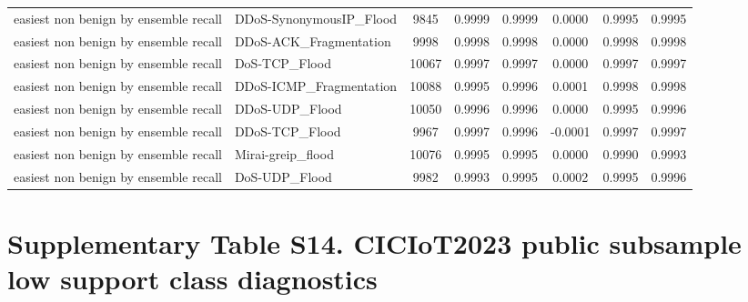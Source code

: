 \documentclass[10pt]{article}
\begin{document}
\begin{center}
\begin{longtable}{p{2.7cm}p{2.5cm}cccccc}
easiest non benign by ensemble recall & DDoS-SynonymousIP\_Flood & 9845 & 0.9999 & 0.9999 & 0.0000 & 0.9995 & 0.9995 \\
easiest non benign by ensemble recall & DDoS-ACK\_Fragmentation & 9998 & 0.9998 & 0.9998 & 0.0000 & 0.9998 & 0.9998 \\
easiest non benign by ensemble recall & DoS-TCP\_Flood & 10067 & 0.9997 & 0.9997 & 0.0000 & 0.9997 & 0.9997 \\
easiest non benign by ensemble recall & DDoS-ICMP\_Fragmentation & 10088 & 0.9995 & 0.9996 & 0.0001 & 0.9998 & 0.9998 \\
easiest non benign by ensemble recall & DDoS-UDP\_Flood & 10050 & 0.9996 & 0.9996 & 0.0000 & 0.9995 & 0.9996 \\
easiest non benign by ensemble recall & DDoS-TCP\_Flood & 9967 & 0.9997 & 0.9996 & -0.0001 & 0.9997 & 0.9997 \\
easiest non benign by ensemble recall & Mirai-greip\_flood & 10076 & 0.9995 & 0.9995 & 0.0000 & 0.9990 & 0.9993 \\
easiest non benign by ensemble recall & DoS-UDP\_Flood & 9982 & 0.9993 & 0.9995 & 0.0002 & 0.9995 & 0.9996 \\
\bottomrule
\end{longtable}
\end{center}

\section*{Supplementary Table S14. CICIoT2023 public subsample low support class diagnostics}
\end{document}
